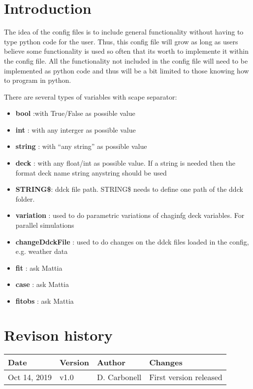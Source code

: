 \documentclass[english]{SPFReport}
\author{Dr. Daniel Carbonell}
\newcommand\Tstrut{\rule{0pt}{2.6ex}}         %
\newcommand\Bstrut{\rule[-0.9ex]{0pt}{0pt}}   %
\begin{document}
 


\section{Introduction}

The idea of the config files is to include general functionality without having to type python code for the user.
Thus, this config file will grow as long as users believe some functionality is used so often that its worth to implemente it within the config file. All the functionality not included in the config file will need to be implemented as python code and thus will be a bit limited to those knowing how to program in python. 

There are several types of variables with scape separator:
\begin{itemize}
\item \textbf{bool} :with True/False as possible value
\item \textbf{int} : with any interger as possible value
\item \textbf{string} : with ``any string'' as possible value
\item \textbf{deck} : with any float/int as possible value. If a string is needed then the format deck name string anystring should be used
\item \textbf{STRING\$}: ddck file path. STRING\$ needs to define one path of the ddck folder. 
\item \textbf{variation} : used to do parametric variations of chaginfg deck variables. For parallel simulations
\item \textbf{changeDdckFile} : used to do changes on the ddck files loaded in the config, e.g. weather data
\item \textbf{fit} : ask Mattia
\item \textbf{case} : ask Mattia
\item \textbf{fitobs} : ask Mattia



\end{itemize}
\section{Revison history}


\begin{tabular}{| l |  l | l  | p{80mm} | }\hline

    \textbf{Date} & \textbf{Version} & \textbf{Author}&\textbf{Changes}  \\\hline
\Tstrut\Bstrut     Oct 14, 2019 & v1.0 & D. Carbonell&First version released \\\hline
  \end{tabular}
\end{document}
